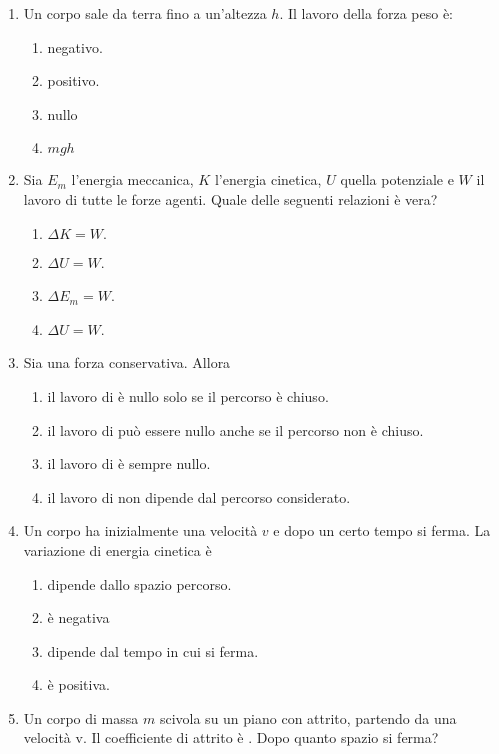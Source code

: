 \documentclass{article}
\begin{document}
\begin{enumerate}
  \item Un corpo sale da terra fino a un'altezza $h$. Il lavoro della forza peso è:
  \begin{enumerate}[label=\Alph*.]
    \item negativo.
    \item positivo.
    \item nullo
    \item $mgh$
  \end{enumerate}
  \item Sia $E_m$ l'energia meccanica, $K$ l'energia cinetica, $U$ quella potenziale e $W$ il lavoro di tutte le forze agenti. Quale delle seguenti relazioni è vera?
  \begin{enumerate}[label=\Alph*.]
    \item $\Delta K=W.$
    \item $\Delta U=W$.
    \item $\Delta E_m=W$.
    \item $\Delta U=W$.
  \end{enumerate}
  \item Sia  una forza conservativa. Allora
  \begin{enumerate}[label=\Alph*.]
    \item il lavoro di  è nullo solo se il percorso è chiuso.
    \item il lavoro di  può essere nullo anche se il percorso non è chiuso.
    \item il lavoro di  è sempre nullo.
    \item il lavoro di  non dipende dal percorso considerato.
  \end{enumerate}
  \item Un corpo ha inizialmente una velocità $v$ e dopo un certo tempo si ferma. La variazione di energia cinetica è
  \begin{enumerate}[label=\Alph*.]
    \item dipende dallo spazio percorso.
    \item è negativa
    \item dipende dal tempo in cui si ferma.
    \item è positiva.
  \end{enumerate}
  \item Un corpo di massa $m$ scivola su un piano con attrito, partendo da una velocità v. Il coefficiente di attrito è \mu. Dopo quanto spazio si ferma?
  \begin{enumerate}[label=\Alph*.]

\end{enumerate}
\end{enumerate}
\end{document}
